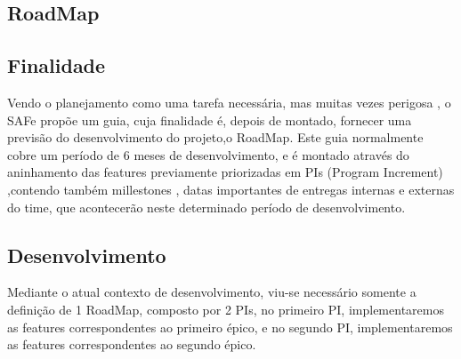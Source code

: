 \begin{appendices}
\chapter{RoadMap}

\section{Finalidade}
Vendo o planejamento como uma tarefa necessária, mas muitas vezes perigosa
, o SAFe propõe um guia, cuja finalidade é, depois de montado, fornecer uma
previsão do desenvolvimento do projeto,o RoadMap.
  Este guia normalmente cobre um período de 6 meses de desenvolvimento, e é montado
através do aninhamento das features previamente priorizadas em PIs (Program Increment)
,contendo também  millestones , datas importantes de
entregas internas e externas do time, que acontecerão neste determinado período de desenvolvimento.

\section{Desenvolvimento}
Mediante o atual contexto de desenvolvimento, viu-se necessário somente a definição de 1 RoadMap,
composto por 2 PIs, no primeiro PI, implementaremos as features correspondentes ao primeiro épico,
e no segundo PI, implementaremos as features correspondentes ao segundo épico.


\end{appendices}
